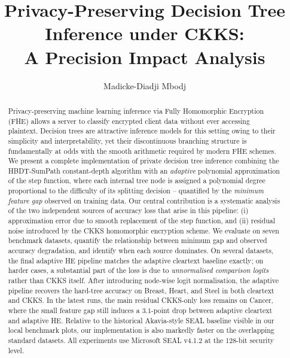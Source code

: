 \documentclass[runningheads]{llncs}
\begin{document}
\title{Privacy-Preserving Decision Tree Inference under CKKS:\\A Precision Impact Analysis}


\author{Madicke-Diadji Mbodj}



\maketitle

\begin{abstract}
Privacy-preserving machine learning inference via Fully Homomorphic
Encryption (FHE) allows a server to classify encrypted client data without
ever accessing plaintext.  Decision trees are attractive inference models
for this setting owing to their simplicity and interpretability, yet their
discontinuous branching structure is fundamentally at odds with the smooth
arithmetic required by modern FHE schemes.  We present a complete
implementation of private decision tree inference combining the HBDT-SumPath
constant-depth algorithm with an \emph{adaptive} polynomial approximation of
the step function, where each internal tree node is assigned a polynomial
degree proportional to the difficulty of its splitting decision -- quantified
by the \emph{minimum feature gap} observed on training data.  Our central
contribution is a systematic analysis of the two independent sources of
accuracy loss that arise in this pipeline: (i) approximation error due to
smooth replacement of the step function, and (ii) residual noise introduced
by the CKKS homomorphic encryption scheme.  We evaluate on seven benchmark
datasets, quantify the relationship between minimum gap and observed accuracy
degradation, and identify when each source dominates.  On several datasets,
the final adaptive HE pipeline matches the adaptive cleartext baseline
exactly; on harder cases, a substantial part of the loss is due to
\emph{unnormalised comparison logits} rather than CKKS itself.  After
introducing node-wise logit normalisation, the adaptive pipeline recovers
the hard-tree accuracy on Breast, Heart, and Steel in both cleartext and
CKKS.  In the latest runs, the main residual CKKS-only loss remains on
Cancer, where the small feature gap still induces a $3.1$-point drop
between adaptive cleartext and adaptive HE.  Relative to the historical
Akavia-style SEAL baseline visible in our local benchmark plots, our
implementation is also markedly faster on the overlapping standard
datasets.  All experiments use Microsoft SEAL v4.1.2 at the 128-bit
security level.
\end{abstract}
\end{document}

